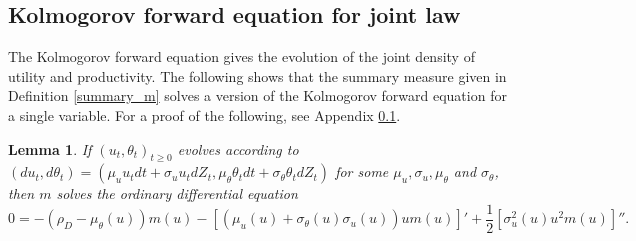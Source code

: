 \documentclass[11pt]{article}
\theoremstyle{plain}
\newtheorem{lemma}[thm]{Lemma}
\begin{document}

\subsection{Kolmogorov forward equation for joint law}\label{Kolm}
The Kolmogorov forward equation gives the evolution of the joint density of utility and productivity. The following shows that the summary measure given in Definition \ref{summary_m} solves a version of the Kolmogorov forward equation for a single variable. For a proof of the following, see Appendix \ref{Kolm}.
\begin{lemma} \label{summarylemma}
If $(u_t,\theta_t)_{t\geq0}$ evolves according to $(du_t,d\theta_t) = (\mu_uu_t dt + \sigma_uu_tdZ_t, \mu_{\theta} \theta_t dt + \sigma_{\theta}\theta_t dZ_t)$ for some $\mu_u,\sigma_u,\mu_{\theta}$ and $\sigma_{\theta}$, then $m$ solves the ordinary differential equation
\begin{equation}
0 = -(\rho_D-\mu_{\theta}(u)) m(u) -  [(\mu_u(u) + \sigma_\theta(u)\sigma_u(u))um(u)]' + \frac{1}{2}[\sigma^2_u(u)u^2m(u)]''.
\label{ODEsummary}
\end{equation}
\end{lemma} 
\end{document}
